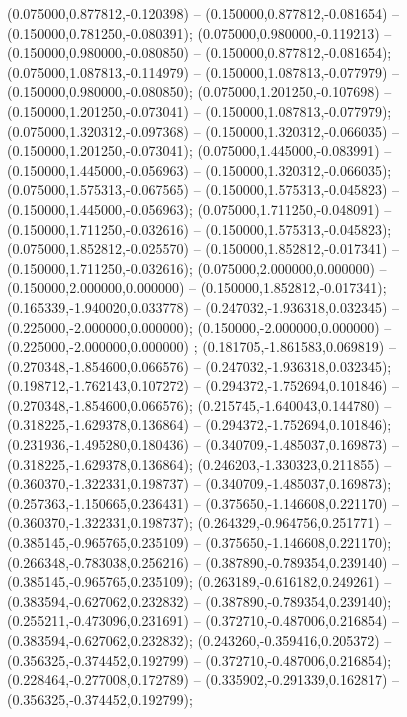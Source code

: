  (0.075000,0.877812,-0.120398) -- (0.150000,0.877812,-0.081654) -- (0.150000,0.781250,-0.080391);
 (0.075000,0.980000,-0.119213) -- (0.150000,0.980000,-0.080850) -- (0.150000,0.877812,-0.081654);
 (0.075000,1.087813,-0.114979) -- (0.150000,1.087813,-0.077979) -- (0.150000,0.980000,-0.080850);
 (0.075000,1.201250,-0.107698) -- (0.150000,1.201250,-0.073041) -- (0.150000,1.087813,-0.077979);
 (0.075000,1.320312,-0.097368) -- (0.150000,1.320312,-0.066035) -- (0.150000,1.201250,-0.073041);
 (0.075000,1.445000,-0.083991) -- (0.150000,1.445000,-0.056963) -- (0.150000,1.320312,-0.066035);
 (0.075000,1.575313,-0.067565) -- (0.150000,1.575313,-0.045823) -- (0.150000,1.445000,-0.056963);
 (0.075000,1.711250,-0.048091) -- (0.150000,1.711250,-0.032616) -- (0.150000,1.575313,-0.045823);
 (0.075000,1.852812,-0.025570) -- (0.150000,1.852812,-0.017341) -- (0.150000,1.711250,-0.032616);
 (0.075000,2.000000,0.000000) -- (0.150000,2.000000,0.000000) -- (0.150000,1.852812,-0.017341);
 (0.165339,-1.940020,0.033778) -- (0.247032,-1.936318,0.032345) -- (0.225000,-2.000000,0.000000);
 (0.150000,-2.000000,0.000000) -- (0.225000,-2.000000,0.000000) ;
 (0.181705,-1.861583,0.069819) -- (0.270348,-1.854600,0.066576) -- (0.247032,-1.936318,0.032345);
 (0.198712,-1.762143,0.107272) -- (0.294372,-1.752694,0.101846) -- (0.270348,-1.854600,0.066576);
 (0.215745,-1.640043,0.144780) -- (0.318225,-1.629378,0.136864) -- (0.294372,-1.752694,0.101846);
 (0.231936,-1.495280,0.180436) -- (0.340709,-1.485037,0.169873) -- (0.318225,-1.629378,0.136864);
 (0.246203,-1.330323,0.211855) -- (0.360370,-1.322331,0.198737) -- (0.340709,-1.485037,0.169873);
 (0.257363,-1.150665,0.236431) -- (0.375650,-1.146608,0.221170) -- (0.360370,-1.322331,0.198737);
 (0.264329,-0.964756,0.251771) -- (0.385145,-0.965765,0.235109) -- (0.375650,-1.146608,0.221170);
 (0.266348,-0.783038,0.256216) -- (0.387890,-0.789354,0.239140) -- (0.385145,-0.965765,0.235109);
 (0.263189,-0.616182,0.249261) -- (0.383594,-0.627062,0.232832) -- (0.387890,-0.789354,0.239140);
 (0.255211,-0.473096,0.231691) -- (0.372710,-0.487006,0.216854) -- (0.383594,-0.627062,0.232832);
 (0.243260,-0.359416,0.205372) -- (0.356325,-0.374452,0.192799) -- (0.372710,-0.487006,0.216854);
 (0.228464,-0.277008,0.172789) -- (0.335902,-0.291339,0.162817) -- (0.356325,-0.374452,0.192799);
